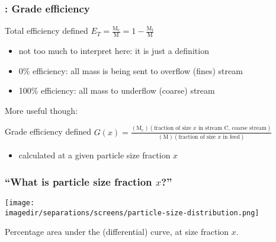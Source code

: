 \begin{frame}\frametitle{{\color{myOrange}{Concept}}: Grade efficiency}
	\begin{exampleblock}{Total efficiency defined}
		$E_T = \displaystyle \frac{\text{M}_\text{c}}{\text{M}} = 1 - \displaystyle \frac{\text{M}_\text{f}}{\text{M}}$
	\end{exampleblock}
	\begin{itemize}
		\item	not too much to interpret here: it is just a definition
		\item	0\% efficiency: all mass is being sent to overflow (fines) stream
		\item	100\% efficiency: all mass to underflow (coarse) stream
	\end{itemize}
	\vspace{12pt}
	More useful though:
	\begin{exampleblock}{Grade efficiency defined}
		$G(x) = \displaystyle \frac{(\text{M}_\text{c})(\text{fraction of size $x$ in stream C, coarse stream})}{(\text{M})(\text{fraction of size $x$ in feed})}$
	\end{exampleblock}
	\begin{itemize}
		\item	calculated at a given particle size fraction $x$
	\end{itemize}
\end{frame}

\begin{frame}\frametitle{``What is particle size fraction $x$?''}
	\begin{center}
		\texttt{[image: \\imagedir/separations/screens/particle-size-distribution.png]}
	\end{center}
	Percentage area under the (differential) curve, at size fraction $x$.
\end{frame}


